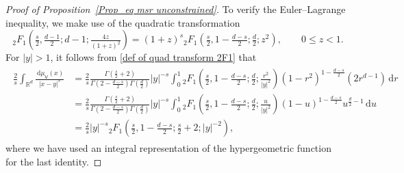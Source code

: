 \documentclass{amsart}
\def\R{\mathbb{R}}
\newcommand{\ud}{\, \mathrm{d}}
\theoremstyle{plain}
\theoremstyle{remark}
\numberwithin{equation}{section}
\begin{document}
\begin{proof}[Proof of Proposition~\ref{Prop_eq msr unconstrained}]
To verify the Euler--Lagrange inequality, we make use of the quadratic
transformation~\cite[Eq.~(15.8.21)]{NIST} 
\begin{equation} \label{def of quad transform 2F1}
    {}_2F_1(\tfrac{s}{2},\tfrac{d-1}{2};d-1;\tfrac{4z}{(1+z)^2})= (1+z)^s {}_2F_1(\tfrac{s}{2}, 1-\tfrac{d-s}{2}; \tfrac{d}{2}; z^2), \qquad 0\le z<1.
\end{equation}  
For $|y|>1$, it follows from \eqref{def of quad transform 2F1} that
\begin{align}
\label{eq: Riesz potential |y|>1}
\begin{split}
    \frac{2}{s}\int_{\R^d}\frac{\ud\mu_\mathsf{V}(x)}{|x-y|^s} &=\frac{2}{s}  \frac{\Gamma(\frac{s}{2}+2)}{\Gamma(2-\frac{d-s}{2})\Gamma(\frac{d}{2})}|y|^{ -s }\int_0^1 {}_2F_1(\tfrac{s}{2}, 1-\tfrac{d-s}{2} ;\tfrac{d}{2}; \tfrac{r^2}{|y|^2}) (1-r^2)^{1-\frac{d-s}{2}} (2r^{d-1})\ud r\\
    &= \frac{2}{s} \frac{\Gamma(\frac{s}{2}+2)}{\Gamma(2-\frac{d-s}{2})\Gamma(\frac{d}{2})}|y|^{ -s}\int_0^1 {}_2F_1(\tfrac{s}{2}, 1-\tfrac{d-s}{2};\tfrac{d}{2}; \tfrac{u}{|y|^2}) (1-u)^{1-\frac{d-s}{2}} u^{\frac{d}{2}-1}\ud u\\
    &= \frac{2}{s}|y|^{ -s } {}_2F_1(\tfrac{s}{2},1-\tfrac{d-s}{2} ;\tfrac{s}{2}+2;|y|^{-2}),
\end{split}
\end{align}  
where we have used an integral representation of the hypergeometric function~\cite[Eq. (15.6.8)]{NIST} for the last identity. 


\end{proof}
\end{document}
